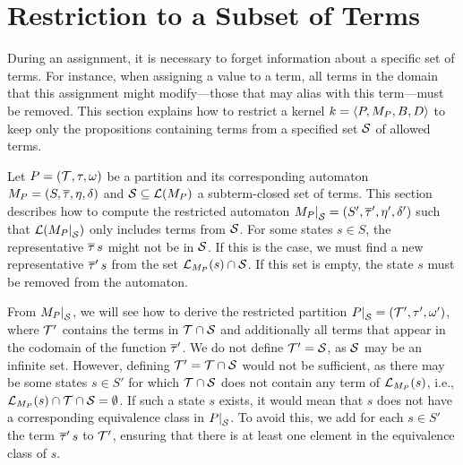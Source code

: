 \section{Restriction to a Subset of Terms}

During an assignment, it is necessary to forget information about a specific set of terms.
For instance, when assigning a value to a term, all terms in the domain that this assignment might modify---those that may alias with this term---must be removed.
This section explains how to restrict a kernel $k = \langle P, M_P, B, D\rangle$
to keep only the propositions containing terms from a specified set $\mathcal{S}$ of allowed terms.

Let $P = (\mathcal{T}, \tau, \omega)$ be a partition and its corresponding automaton $M_P = (S, \overline{\tau}, \eta, \delta)$ and $\mathcal{S} \subseteq \mathcal{L}(M_P)$ a subterm-closed set of terms.
This section describes how to compute the restricted automaton $\restr{M_P}{\Set} = (S', \otau', \eta', \delta')$ such that $\L(\restr{M_P}{\Set})$ only includes terms from $\mathcal{S}$.
For some states $s \in S$, the representative $\overline{\tau}\,s$ might not be in $\mathcal{S}$.
If this is the case, we must find a new representative $\overline{\tau}'\,s$ from the set $\mathcal{L}_{M_P}(s) \cap \mathcal{S}$.
If this set is empty, the state $s$ must be removed from the automaton.

From $\restr{M_P}{\Set}$, we will see how to derive the restricted partition $\restr{P}{\Set} = (\T', \tau', \omega')$, where $\mathcal{T}'$ contains the terms in $\mathcal{T} \cap \mathcal{S}$ and additionally all terms that appear in the codomain of the function $\overline{\tau}'$.
We do not define $\mathcal{T}' = \mathcal{S}$, as $\mathcal{S}$ may be an infinite set.
However, defining $\mathcal{T}' = \mathcal{T} \cap \mathcal{S}$ would not be sufficient, as there may be some states $s \in S'$ for which
$\mathcal{T} \cap \mathcal{S}$ does not contain any term of $\mathcal{L}_{M_P}(s)$, i.e.,
$\mathcal{L}_{M_P}(s) \cap \mathcal{T} \cap \mathcal{S} = \emptyset$.
If such a state $s$ exists, it would mean that $s$ does not have a corresponding equivalence class in $\restr{P}{\Set}$.
To avoid this, we add for each $s \in S'$ the term $\overline{\tau}'\,s$ to $\mathcal{T}'$, ensuring that there is at least one element in the equivalence class of $s$.

